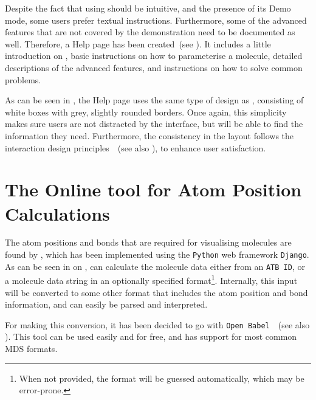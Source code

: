 Despite the fact that using \oframp{} should be intuitive, and the presence of its Demo mode, some users prefer textual instructions. Furthermore, some of the advanced features that are not covered by the demonstration need to be documented as well. Therefore, a Help page has been created~(see ). It includes a little introduction on \oframp, basic instructions on how to parameterise a molecule, detailed descriptions of the advanced features, and instructions on how to solve common problems.

As can be seen in , the Help page uses the same type of design as \oframp, consisting of white boxes with grey, slightly rounded borders. Once again, this simplicity makes sure users are not distracted by the interface, but will be able to find the information they need. Furthermore, the consistency in the layout follows the interaction design principles~\cite{norman2010gestural,blair2008user}~(see also ), to enhance user satisfaction.


\section[\oapoc]{The Online tool for Atom Position Calculations}

The atom positions and bonds that are required for visualising molecules are found by \oapoc, which has been implemented using the \verb|Python| web framework \verb|Django|. As can be seen in  on , \oapoc{} can calculate the molecule data either from an \verb|ATB ID|, or a molecule data string in an optionally specified format\footnote{When not provided, the format will be guessed automatically, which may be error-prone.}. Internally, this input will be converted to some other format that includes the atom position and bond information, and can easily be parsed and interpreted.

For making this conversion, it has been decided to go with \verb|Open Babel|~\cite{oboyle2011open}~(see also ). This tool can be used easily and for free, and has support for most common MDS formats.


